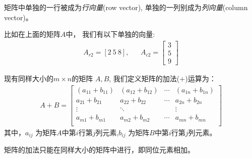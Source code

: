 \documentclass[12pt]{article}
\numberwithin{figure}{section}
\numberwithin{equation}{section}
\begin{document}
\begin{definition}
	矩阵中单独的一行被成为\textit{行向量}(row vector), 单独的一列别成为\textit{列向量}(column vector)。
\end{definition}
\begin{example}
比如在上面的矩阵$A$中，	我们有以下单独的向量:
\begin{align*}
	A_{r2} = [2 \ 5 \ 8],  & & A_{c2} = \begin{bmatrix}
		3 \\
		5 \\
		9 
	\end{bmatrix}
\end{align*}
\end{example}

\begin{definition}
	现有同样大小的$m \times n$的矩阵 $A, B$, 我们定义矩阵的加法($+$)运算为：
	\begin{align*}
		A + B = \begin{bmatrix}
			(a_{11} + b_{11}) & (a_{12}+b_{12}) & \cdots & (a_{1n}+b_{1n}) \\
			a_{21} + b_{21} & a_{22}+b_{22} & \cdots & a_{2n}+b_{2n} \\
			\vdots & \ddots & & \vdots \\
			a_{m1} + b_{m1} & a_{m2}+b_{m2} & \cdots & a_{mn}+b_{mn} \\
		\end{bmatrix}
	\end{align*}
	其中，$a_{ij}$ 为矩阵$A$中第$i$行第$j$列元素,$b_{ij}$ 为矩阵$B$中第$i$行第$j$列元素。
\end{definition}

\begin{remark}
矩阵的加法只能在同样大小的矩阵中进行，即同位元素相加。	
\end{remark}
\end{document}
